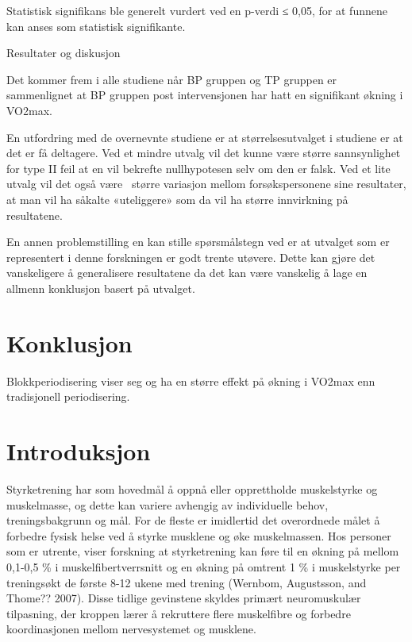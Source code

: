 \documentclass[
  letterpaper,
  DIV=11,
  numbers=noendperiod]{scrreprt}
\begin{document}
Statistisk signifikans ble generelt vurdert ved en p-verdi ≤ 0,05, for
at funnene kan anses som statistisk signifikante.

Resultater og diskusjon

Det kommer frem i alle studiene når BP gruppen og TP gruppen er
sammenlignet at BP gruppen post intervensjonen har hatt en signifikant
økning i VO2max.~

En utfordring med de overnevnte studiene er at størrelsesutvalget i
studiene er at det er få deltagere. Ved et mindre utvalg vil det kunne
være større sannsynlighet for type II feil at en vil bekrefte
nullhypotesen selv om den er falsk. Ved et lite utvalg vil det også
være~ større variasjon mellom forsøkspersonene sine resultater, at man
vil ha såkalte «uteliggere» som da vil ha større innvirkning på
resultatene.

En annen problemstilling en kan stille spørsmålstegn ved er at utvalget
som er representert i denne forskningen er godt trente utøvere. Dette
kan gjøre det vanskeligere å generalisere resultatene da det kan være
vanskelig å lage en allmenn konklusjon basert på utvalget.


\chapter{Konklusjon}\label{konklusjon}

Blokkperiodisering viser seg og ha en større effekt på økning i VO2max
enn tradisjonell periodisering.


\chapter{Introduksjon}\label{introduksjon-4}

Styrketrening har som hovedmål å oppnå eller opprettholde muskelstyrke
og muskelmasse, og dette kan variere avhengig av individuelle behov,
treningsbakgrunn og mål. For de fleste er imidlertid det overordnede
målet å forbedre fysisk helse ved å styrke musklene og øke muskelmassen.
Hos personer som er utrente, viser forskning at styrketrening kan føre
til en økning på mellom 0,1-0,5 \% i muskelfibertverrsnitt og en økning
på omtrent 1 \% i muskelstyrke per treningsøkt de første 8-12 ukene med
trening (Wernbom, Augustsson, and Thome?? 2007). Disse tidlige
gevinstene skyldes primært neuromuskulær tilpasning, der kroppen lærer å
rekruttere flere muskelfibre og forbedre koordinasjonen mellom
nervesystemet og musklene.
\end{document}
